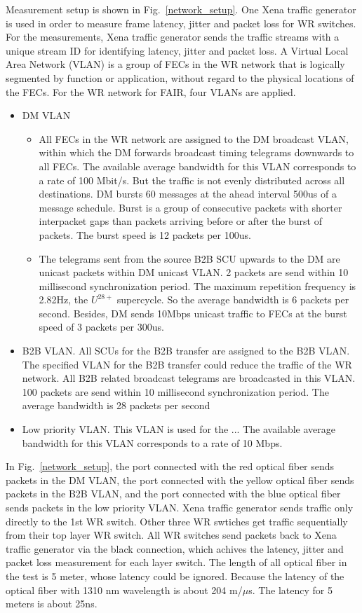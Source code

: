 Measurement setup is shown in Fig.~\ref{network_setup}. One Xena traffic generator is used in order to measure frame latency, jitter and packet loss for WR switches. For the measurements, Xena traffic generator sends the traffic streams with a unique stream ID for identifying latency, jitter and packet loss. A Virtual Local Area Network (VLAN) is a group of FECs in the WR network that is logically segmented by function or application, without regard to the physical
locations of the FECs. For the WR network for FAIR, four VLANs are applied. 

\begin{itemize}
    \item DM VLAN 
		\begin{itemize}
			\item All FECs in the WR network are assigned to the DM broadcast VLAN, within which the DM forwards broadcast timing telegrams downwards to all FECs. The available average bandwidth for this VLAN corresponds to a rate of 100 Mbit/s. But the traffic is not evenly distributed across all destinations. DM bursts 60 messages at the ahead interval 500us of a message schedule. Burst is a group of consecutive packets with shorter interpacket gaps than packets arriving before or after the burst of packets. The burst speed is 12 packets per 100us.
 			\item The telegrams sent from the source B2B SCU upwards to the DM are unicast packets within DM unicast VLAN. 2 packets are send within 10 millisecond synchronization period. The maximum repetition frequency is  2.82Hz, the $U^{28+}$ supercycle. So the average bandwidth is 6 packets per second. Besides, DM sends 10Mbps unicast traffic to FECs at the burst speed of 3 packets per 300us.
		\end{itemize}
	\item B2B VLAN. All SCUs for the B2B transfer are assigned to the B2B VLAN. The specified VLAN for the B2B transfer could reduce the traffic of the WR network. All B2B related broadcast telegrams are broadcasted in this VLAN. 100 packets are send within 10 millisecond synchronization period. The average bandwidth is 28 packets per second
	\item Low priority VLAN. This VLAN is used for the ...  The available average bandwidth for this VLAN corresponds to a rate of 10 Mbps. 
\end{itemize}

    In Fig.~\ref{network_setup}, the port connected with the red optical fiber sends packets in the DM VLAN, the port connected with the yellow optical fiber sends packets in the B2B VLAN, and the port connected with the blue optical fiber sends packets in the low priority VLAN. Xena traffic generator sends traffic only directly to the 1st WR switch. Other three WR swtiches get traffic sequentially from their top layer WR switch. All WR switches send packets back to Xena traffic generator via the black connection, which achives the latency, jitter and packet loss measurement for each layer switch. The length of all optical fiber in the test is 5 meter, whose latency could be ignored. Because the latency of the optical fiber with 1310 nm wavelength is about 204 m/$\mu$s. The latency for 5 meters is about 25ns.

